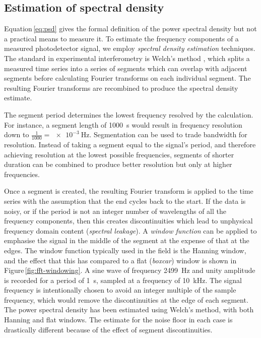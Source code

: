 \subsection{\label{sec:windowing}Estimation of spectral density}
Equation\,\ref{eq:psd} gives the formal definition of the power spectral density but not a practical means to measure it. To estimate the frequency components of a measured photodetector signal, we employ \emph{spectral density estimation} techniques. The standard in experimental interferometry is Welch's method \cite{Welch1967}, which splits a measured time series into a series of segments which can overlap with adjacent segments before calculating Fourier transforms on each individual segment. The resulting Fourier transforms are recombined to produce the spectral density estimate.

The segment period determines the lowest frequency resolved by the calculation. For instance, a segment length of \SI{1000}{\second} would result in frequency resolution down to $\frac{1}{1000} = \SI{e-3}{\hertz}$. Segmentation can be used to trade bandwidth for resolution. Instead of taking a segment equal to the signal's period, and therefore achieving resolution at the lowest possible frequencies, segments of shorter duration can be combined to produce better resolution but only at higher frequencies.

Once a segment is created, the resulting Fourier transform is applied to the time series with the assumption that the end cycles back to the start. If the data is noisy, or if the period is not an integer number of wavelengths of all the frequency components, then this creates discontinuities which lead to unphysical frequency domain content (\emph{spectral leakage}). A \emph{window function} can be applied to emphasise the signal in the middle of the segment at the expense of that at the edges. The window function typically used in the field is the Hanning window, and the effect that this has compared to a flat (\emph{boxcar}) window is shown in Figure\,\ref{fig:fft-windowing}. A sine wave of frequency \SI{2499}{\hertz} and unity amplitude is recorded for a period of \SI{1}{\second}, sampled at a frequency of \SI{10}{\kilo\hertz}. The signal frequency is intentionally chosen to avoid an integer multiple of the sample frequency, which would remove the discontinuities at the edge of each segment. The power spectral density has been estimated using Welch's method, with both Hanning and flat windows. The estimate for the noise floor in each case is drastically different because of the effect of segment discontinuities.

